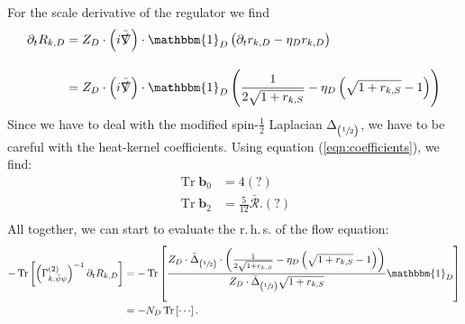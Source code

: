 For the scale derivative of the regulator we find
\begin{equation}
\begin{aligned}
	\partial_tR_{k,D} &=  
	Z_D\cdot\left(i\bar{\slashed{\nabla}}\right)\cdot\mathbbm{1}_D\left(\partial_t r_{k,D} - \eta_D r_{k,D}\right) \\[10pt]
	&=Z_D\cdot\left(i\bar{\slashed{\nabla}}\right)\cdot\mathbbm{1}_D\left(\frac{1}{2\sqrt{1+r_{k, S}}} - \eta_D\left(\sqrt{1+r_{k,S}} -1\right)\right)
\end{aligned} 
\end{equation}
Since we have to deal with the modified spin-$\frac{1}{2}$ Laplacian $\Delta_{\left(\sfrac{1}{2}\right)}$, we have to be careful with the heat-kernel coefficients. Using equation (\ref{eqn:coefficients}), we find:
\begin{equation}
\begin{aligned}
	\operatorname{Tr}\mathbf{b}_0 &= 4 (?)\\
	\operatorname{Tr}\mathbf{b}_2 &= \frac{5}{12}\bar{\mathcal{R}}. (?) \\
\end{aligned} 
\end{equation}
All together, we can start to evaluate the r.\,h.\,s. of the flow equation:
\begin{equation}
\begin{aligned}
	-\tr{\left(\Gamma^{(2)}_{k, \bar{\psi}\psi}\right)^{-1}\partial_t R_{k,D}} &=-\tr{\frac{Z_D\cdot\bar{\Delta}_{\left(\sfrac{1}{2}\right)}\cdot\left(\frac{1}{2\sqrt{1+r_{k, S}}} - \eta_D\left(\sqrt{1+r_{k,S}} -1\right)\right)}{Z_D\cdot\bar{\Delta}_{\left(\sfrac{1}{2}\right)}\sqrt{1 + r_{k,S}}}\mathbbm{1}_D} \\
	&=   -N_D\tr{\cdots}.
\end{aligned}
\end{equation}

